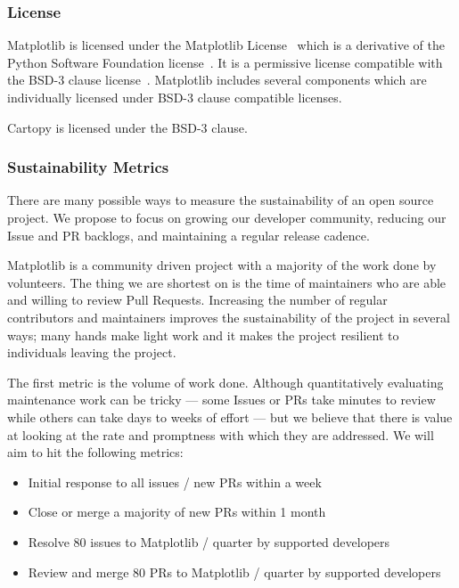 \documentclass[12pt]{article}
\numberwithin{page}{section}
\begin{document}

\subsubsection{License}

Matplotlib is licensed under the Matplotlib License~\cite{mpl_lic} which is a
derivative of the Python Software Foundation license~\cite{psf_lic}.  It is a
permissive license compatible with the BSD-3 clause
license~\cite{jdh_bsd_opinions}.  Matplotlib includes several components which
are individually licensed under BSD-3 clause compatible licenses.

Cartopy is licensed under the BSD-3 clause.


\subsubsection{Sustainability Metrics}

There are many possible ways to measure the sustainability of an
open source project.  We propose to focus on growing our developer
community, reducing our Issue and PR backlogs, and maintaining a
regular release cadence.

Matplotlib is a community driven project with a majority of the
work done by volunteers.  The thing we are shortest on is the time of
maintainers who are able and willing to review Pull Requests.
Increasing the number of regular contributors and maintainers improves
the sustainability of the project in several ways; many hands make
light work and it makes the project resilient to individuals leaving
the project.

The first metric is the volume of work done.  Although quantitatively
evaluating maintenance work can be tricky --- some Issues or PRs take minutes
to review while others can take days to weeks of effort --- but we believe that
there is value at looking at the rate and promptness with which they are
addressed.  We will aim to hit the following metrics:
\begin{itemize}[noitemsep]
\item Initial response to all issues / new PRs within a week  %
\item Close or merge a majority of new PRs within 1 month     %
\item Resolve 80 issues to Matplotlib / quarter by supported developers       %
\item Review and merge 80 PRs to Matplotlib / quarter by supported developers %
\end{itemize}
\end{document}
